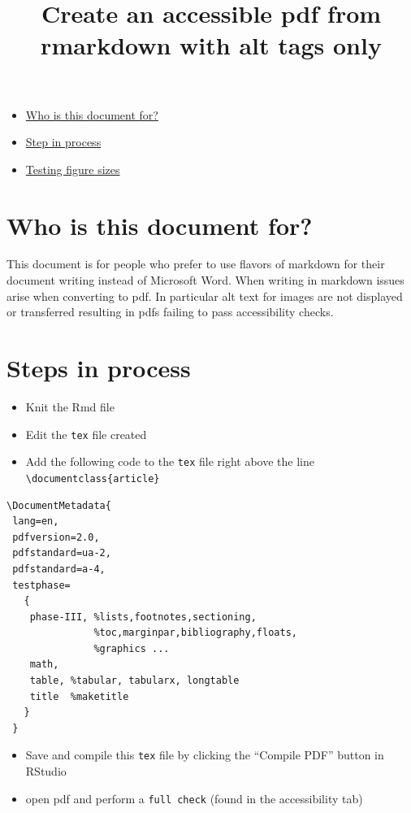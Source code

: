 \documentclass[
]{article}
\title{Create an accessible pdf from rmarkdown with alt tags only}
\author{}
\date{\vspace{-2.5em}}
\providecommand{\tightlist}{%
  \setlength{\itemsep}{0pt}\setlength{\parskip}{0pt}}
\begin{document}
\maketitle

\begin{itemize}
\tightlist
\item
  \hyperref[who-is-this-document-for]{Who is this document for?}
\item
  \hyperref[steps-in-process]{Step in process}
\item
  \hyperref[testing-figure-sizes]{Testing figure sizes}
\end{itemize}

\section{Who is this document for?}\label{who-is-this-document-for}

This document is for people who prefer to use flavors of markdown for
their document writing instead of Microsoft Word. When writing in
markdown issues arise when converting to pdf. In particular alt text for
images are not displayed or transferred resulting in pdfs failing to
pass accessibility checks.

\section{Steps in process}\label{steps-in-process}

\begin{itemize}
\tightlist
\item
  Knit the Rmd file
\item
  Edit the \texttt{tex} file created
\item
  Add the following code to the \texttt{tex} file right above the line
  \texttt{\textbackslash{}documentclass\{article\}}
\end{itemize}

\begin{verbatim}
\DocumentMetadata{
 lang=en,
 pdfversion=2.0,
 pdfstandard=ua-2,
 pdfstandard=a-4,
 testphase=
   {
    phase-III, %lists,footnotes,sectioning,
               %toc,marginpar,bibliography,floats,
               %graphics ...
    math,  
    table, %tabular, tabularx, longtable
    title  %maketitle
   }
 }
\end{verbatim}

\begin{itemize}
\tightlist
\item
  Save and compile this \texttt{tex} file by clicking the ``Compile
  PDF'' button in RStudio
\item
  open pdf and perform a \texttt{full\ check} (found in the
  accessibility tab)
\end{itemize}
\end{document}

